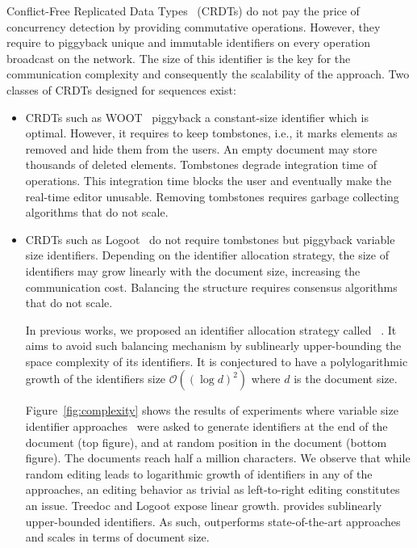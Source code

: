 Conflict-Free Replicated Data Types~\cite{shapiro2011comprehensive} (CRDTs) do
not pay the price of concurrency detection by providing commutative
operations. However, they require to piggyback unique and immutable identifiers
on every operation broadcast on the network. The size of this identifier is the
key for the communication complexity and consequently the scalability of the
approach. Two classes of CRDTs designed for sequences exist:
\begin{itemize}
\item CRDTs such as WOOT~\cite{oster2006data} piggyback a constant-size
  identifier which is optimal. However, it requires to keep tombstones, i.e., it
  marks elements as removed and hide them from the users. An empty document may
  store thousands of deleted elements. Tombstones degrade integration time of
  operations. This integration time blocks the user and eventually make the
  real-time editor unusable. Removing tombstones requires garbage
  collecting algorithms that do not scale.
\item CRDTs such as Logoot~\cite{weiss2010logootundo} do not require tombstones
  but piggyback variable size identifiers. Depending on the identifier
  allocation strategy, the size of identifiers may grow linearly with the
  document size, increasing the communication cost. Balancing the structure
  requires consensus algorithms that do not scale.

  In previous works, we proposed an identifier allocation strategy called
  \LSEQ~\cite{nedelec2013concurrency, nedelec2013lseq}. It aims to avoid such
  balancing mechanism by sublinearly upper-bounding the space complexity of its
  identifiers. It is conjectured to have a polylogarithmic growth of the
  identifiers size $\mathcal{O}((\log d)^2)$ where $d$ is the document
  size.
  
  Figure~\ref{fig:complexity} shows the results of experiments where variable
  size identifier approaches~\cite{nedelec2013lseq, preguica2009commutative,
    weiss2009logoot} were asked to generate identifiers at the end of the
  document (top figure), and at random position in the document (bottom
  figure). The documents reach half a million characters. We observe that while
  random editing leads to logarithmic growth of identifiers in any of the
  approaches, an editing behavior as trivial as left-to-right editing
  constitutes an issue. Treedoc and Logoot expose linear growth. \LSEQ provides
  sublinearly upper-bounded identifiers. As such, \LSEQ outperforms
  state-of-the-art approaches and scales in terms of document size.
\end{itemize}

